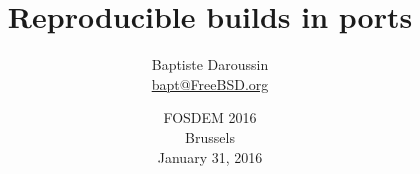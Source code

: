 
\usepackage{color}
\usepackage{listings}
\usepackage{tipa}
\usepackage{svg}
\newcommand{\prestitle}{FOSDEM 2016}
\newcommand{\prev}[1]{\href{https://svnweb.freebsd.org/changeset/ports/#1}{r#1}}
\lstset{
	numbers=none,
	frame=l,
	aboveskip=0pt, belowskip=0pt
}

\usepackage{tikz}

\title{Reproducible builds in ports}
\author{Baptiste Daroussin \\ \url{bapt@FreeBSD.org}}
\date{FOSDEM 2016 \\ Brussels \\ January 31, 2016}


\begin{frame}[plain]
	\titlepage
\end{frame}

